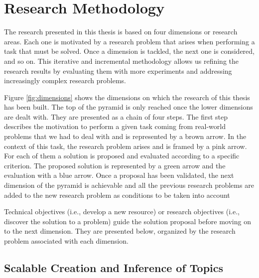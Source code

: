 \section{Research Methodology}\label{sec:research-methodology}

The research presented in this thesis is based on four dimensions or research areas. Each one is motivated by a research problem that arises when performing a task that must be solved. Once a dimension is tackled, the next one is considered, and so on. This iterative and incremental methodology allows us refining the research results by evaluating them with more experiments and addressing increasingly complex research problems.

Figure \ref{fig:dimensions} shows the dimensions on which the research of this thesis has been built. The top of the pyramid is only reached once the lower dimensions are dealt with. They are presented as a chain of four steps. The first step describes the motivation to perform a given task coming from real-world problems that we had to deal with and is represented by a brown arrow. In the context of this task, the research problem arises and is framed by a pink arrow. For each of them a solution is proposed and evaluated according to a specific criterion. The proposed solution is represented by a green arrow and the evaluation with a blue arrow. Once a proposal has been validated, the next dimension of the pyramid is achievable and all the previous research problems are added to the new research problem as conditions to be taken into account

Technical objectives (i.e., develop a new resource) or research objectives (i.e., discover the solution to a problem) guide the solution proposal before moving on to the next dimension. They are presented below, organized by the research problem associated with each dimension.


\subsection{Scalable Creation and Inference of Topics}

